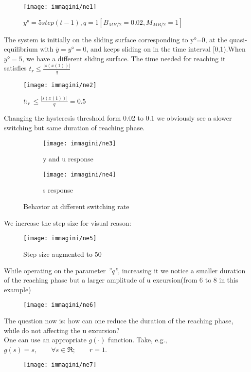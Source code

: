 \begin{figure}[H]
	\centering
	\texttt{[image: immagini/ne1]}
	\caption{$y°=5step(t-1), q=1[B_{MB/2}=0.02,M_{MB/2}=1]$}
	\label{fig:ne1}
\end{figure}
The system is initially on the sliding surface corresponding to y°=0, at the quasi-equilibrium with $\bar{y}=y°=0$, and keeps sliding on in the time interval [0,1).When $y°=5$, we have a different sliding surface. The time needed for reaching it satisfies $t_r\le\frac{|s(x(1))|}{q}$
\begin{figure}[H]
	\centering
	\texttt{[image: immagini/ne2]}
	\caption{$t:_r\le\frac{|s(x(1))|}{q}=0.5$}
	\label{fig:ne2}
\end{figure}
Changing the hysteresis threshold form 0.02 to 0.1 we obviously see a slower switching but same duration of reaching phase.

\begin{figure}[H]
	\centering
	\begin{subfigure}[b]{0.3\textwidth}
		\centering
		\texttt{[image: immagini/ne3]}
		\caption{y and u response}
		\label{fig:ne3}
	\end{subfigure}
	\hfill
	\begin{subfigure}[b]{0.3\textwidth}
		\centering
		\texttt{[image: immagini/ne4]}
		\caption{s response}
		\label{fig:ne4}
	\end{subfigure}
	\hfill
	\label{fig:ne34}
	\caption{Behavior at different switching rate}
\end{figure}
We increase the step size for visual reason:
\begin{figure}[H]
	\centering
	\texttt{[image: immagini/ne5]}
	\caption{Step size augmented to 50}
	\label{fig:ne5}
\end{figure}

While operating on the parameter \emph{''q''}, increasing it we notice a smaller duration of the reaching phase but a larger amplitude of u excursion(from 6 to 8 in this example)
\begin{figure}[H]
	\centering
	\texttt{[image: immagini/ne6]}
	\caption{}
	\label{fig:ne6}
\end{figure}
The question now is: how can one reduce the duration of the reaching phase, while do not affecting the u excursion? \\One can use an appropriate $g(\cdot)$ function. Take, e.g., $g(s)=s,\qquad \forall s\in \Re; \qquad r=1$.
\begin{figure}[H]
	\centering
	\texttt{[image: immagini/ne7]}
	\caption{}
	\label{fig:ne7}
\end{figure}
